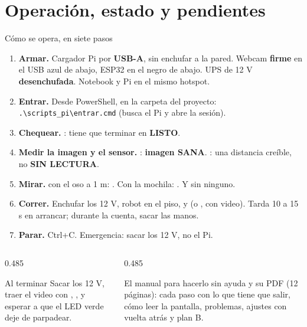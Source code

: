 \section{Operación, estado y pendientes}

\begin{frame}{Cómo se opera, en siete pasos}
  \begin{enumerate}
    \item \textbf{Armar.} Cargador \hacia{} Pi por \textbf{USB-A}, sin
          enchufar a la pared. Webcam \textbf{firme} en el USB azul de abajo,
          ESP32 en el negro de abajo. UPS de 12 V \textbf{desenchufada}.
          Notebook y Pi en el mismo hotspot.
    \item \textbf{Entrar.} Desde PowerShell, en la carpeta del proyecto:
          \texttt{.\textbackslash scripts\_pi\textbackslash entrar.cmd} (busca
          el Pi y abre la sesión).
    \item \textbf{Chequear.} : tiene
          que terminar en \textbf{LISTO}.
    \item \textbf{Medir la imagen y el sensor.} :
          \textbf{imagen SANA}. : una distancia creíble, no
          \textbf{SIN LECTURA}.
    \item \textbf{Mirar.}  con el oso a 1 m: .
          Con la mochila: . Y  sin ninguno.
    \item \textbf{Correr.} Enchufar los 12 V, robot en el piso, y
           (o , con video). Tarda 10
          a 15 s en arrancar; durante la cuenta, sacar las manos.
    \item \textbf{Parar.} Ctrl+C. Emergencia: sacar los 12 V, no el Pi.
  \end{enumerate}

  \vspace{0.3em}
  \begin{columns}[T,onlytextwidth]
    \begin{column}{0.485\textwidth}
      \begin{block}{Al terminar}
        {\footnotesize Sacar los 12 V, traer el video con
        , , y esperar a que
        el LED verde deje de parpadear.}
      \end{block}
    \end{column}
    \begin{column}{0.485\textwidth}
      \begin{block}{El manual para hacerlo sin ayuda}
        {\footnotesize {} y su PDF (12 páginas): cada paso
        con lo que tiene que salir, cómo leer la pantalla, problemas, ajustes
        con vuelta atrás y plan B.}
      \end{block}
    \end{column}
  \end{columns}
\end{frame}

